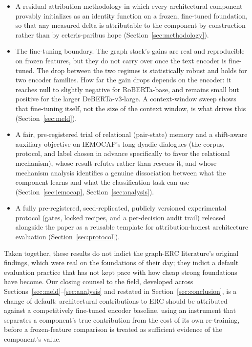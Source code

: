 \begin{itemize}
\item[\textbf{C1}] A residual attribution methodology in which every architectural component provably initializes as an identity function on a frozen, fine-tuned foundation, so that any measured delta is attributable to the component by construction rather than by ceteris-paribus hope (Section~\ref{sec:methodology}).
\item[\textbf{C2}] The fine-tuning boundary. The graph stack's gains are real and reproducible on frozen features, but they do not carry over once the text encoder is fine-tuned. The drop between the two regimes is statistically robust and holds for two encoder families. How far the gain drops depends on the encoder: it reaches null to slightly negative for RoBERTa-base, and remains small but positive for the larger DeBERTa-v3-large. A context-window sweep shows that fine-tuning itself, not the size of the context window, is what drives this (Section~\ref{sec:meld}).
\item[\textbf{C3}] A fair, pre-registered trial of relational (pair-state) memory and a shift-aware auxiliary objective on IEMOCAP's long dyadic dialogues (the corpus, protocol, and label chosen in advance specifically to favor the relational mechanism), whose result refutes rather than rescues it, and whose mechanism analysis identifies a genuine dissociation between what the component learns and what the classification task can use (Section~\ref{sec:iemocap}, Section~\ref{sec:analysis}).
\item[\textbf{C4}] A fully pre-registered, seed-replicated, publicly versioned experimental protocol (gates, locked recipes, and a per-decision audit trail) released alongside the paper as a reusable template for attribution-honest architecture evaluation (Section~\ref{sec:protocol}).
\end{itemize}

Taken together, these results do not indict the graph-ERC literature's original findings, which were real on the foundations of their day; they indict a default evaluation practice that has not kept pace with how cheap strong foundations have become. Our closing counsel to the field, developed across Sections~\ref{sec:meld}--\ref{sec:analysis} and restated in Section~\ref{sec:conclusion}, is a change of default: architectural contributions to ERC should be attributed against a competitively fine-tuned encoder baseline, using an instrument that separates a component's true contribution from the cost of its own re-training, before a frozen-feature comparison is treated as sufficient evidence of the component's value.

